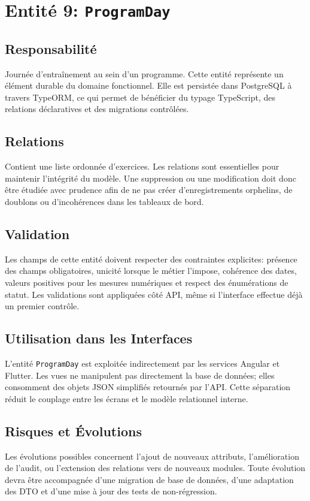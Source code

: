 \section{Entité 9: \texttt{ProgramDay}}
\subsection{Responsabilité}
Journée d’entraînement au sein d’un programme. Cette entité représente un élément durable du domaine fonctionnel. Elle est persistée dans PostgreSQL à travers TypeORM, ce qui permet de bénéficier du typage TypeScript, des relations déclaratives et des migrations contrôlées.

\subsection{Relations}
Contient une liste ordonnée d’exercices. Les relations sont essentielles pour maintenir l'intégrité du modèle. Une suppression ou une modification doit donc être étudiée avec prudence afin de ne pas créer d'enregistrements orphelins, de doublons ou d'incohérences dans les tableaux de bord.

\subsection{Validation}
Les champs de cette entité doivent respecter des contraintes explicites: présence des champs obligatoires, unicité lorsque le métier l'impose, cohérence des dates, valeurs positives pour les mesures numériques et respect des énumérations de statut. Les validations sont appliquées côté API, même si l'interface effectue déjà un premier contrôle.

\subsection{Utilisation dans les Interfaces}
L'entité \texttt{ProgramDay} est exploitée indirectement par les services Angular et Flutter. Les vues ne manipulent pas directement la base de données; elles consomment des objets JSON simplifiés retournés par l'API. Cette séparation réduit le couplage entre les écrans et le modèle relationnel interne.

\subsection{Risques et Évolutions}
Les évolutions possibles concernent l'ajout de nouveaux attributs, l'amélioration de l'audit, ou l'extension des relations vers de nouveaux modules. Toute évolution devra être accompagnée d'une migration de base de données, d'une adaptation des DTO et d'une mise à jour des tests de non-régression.

